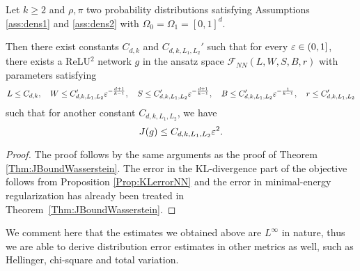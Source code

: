 \begin{theorem}\label{Thm:JBoundKL}
Let $k \geq 2$ and $\rho, \pi$ two probability distributions satisfying Assumptions \ref{ass:dens1} and \ref{ass:dens2} with $\Omega_0 = \Omega_1 = [0,1]^d$.

Then there exist constants $C_{d,k}$ and $C_{d, k, L_1, L_2}'$ such that for every $\varepsilon\in(0,1]$, there exists a ReLU$^2$ network $g$ in the ansatz space $\mathcal{F}_{NN}(L, W, S, B, r) $ with parameters satisfying
\begin{equation*}
  L \leq C_{d,k},\quad
  W \leq C_{d, k, L_1, L_2}'\varepsilon^{-\frac{d+1}{k-1}},\quad
  S\leq C_{d, k, L_1, L_2}'\varepsilon^{-\frac{d+1}{k-1}},\quad
  B\leq C_{d, k, L_1,L_2}'\varepsilon^{-\frac{1}{k-1}},\quad
  r\leq C_{d, k, L_1, L_2}'
\end{equation*}
  such that for another constant $C_{d, k, L_1, L_2}$, we have
\[J(g) \leq 
C_{d, k ,L_1, L_2}\varepsilon^2.\]
\end{theorem}
\begin{proof}
The proof follows %
by the same arguments as the proof of Theorem \ref{Thm:JBoundWasserstein}. The error in the KL-divergence part of the objective follows from Proposition \ref{Prop:KLerrorNN} and the error in minimal-energy regularization has already been %
treated in Theorem~\ref{Thm:JBoundWasserstein}.    
\end{proof}


\begin{remark}
We comment here that the estimates we obtained above are $L^\infty$ in nature, thus we are able to derive distribution error estimates in other metrics as well, such as Hellinger, chi-square and total variation.  
\end{remark}





























